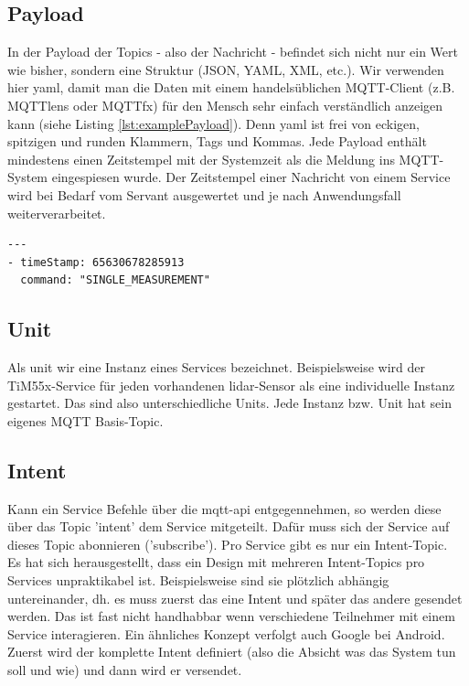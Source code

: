 \subsection{Payload}
In der Payload der Topics - also der Nachricht - befindet sich nicht nur ein Wert wie bisher, sondern eine Struktur (JSON, YAML, XML, etc.). Wir verwenden hier \acrshort{yaml}, damit man die Daten mit einem handelsüblichen MQTT-Client (z.B. MQTTlens\cite{mqtt-lens} oder MQTTfx\cite{mqttfx}) für den Mensch sehr einfach verständlich anzeigen kann (siehe Listing \ref{lst:examplePayload}). Denn \acrshort{yaml} ist frei von eckigen, spitzigen und runden Klammern, Tags und Kommas. Jede Payload enthält mindestens einen Zeitstempel mit der Systemzeit als die Meldung ins MQTT-System eingespiesen wurde. Der Zeitstempel einer Nachricht von einem Service wird bei Bedarf vom Servant ausgewertet und je nach Anwendungsfall weiterverarbeitet.

\begin{lstlisting}[caption={Beispiel einer MQTT-Payload}, label={lst:examplePayload}]
---
- timeStamp: 65630678285913
  command: "SINGLE_MEASUREMENT"
\end{lstlisting}

\subsection{Unit}
Als \gls{unit} wir eine Instanz eines Services bezeichnet. Beispielsweise wird der TiM55x-Service für jeden vorhandenen \acrshort{lidar}-Sensor als eine individuelle Instanz gestartet. Das sind also unterschiedliche Units. Jede Instanz bzw. Unit hat sein eigenes MQTT Basis-Topic.

\subsection{Intent}
Kann ein Service Befehle über die \acrshort{mqtt}-\acrshort{api} entgegennehmen, so werden diese über das Topic '\gls{intent}' dem Service mitgeteilt. Dafür muss sich der Service auf dieses Topic abonnieren ('subscribe'). Pro Service gibt es nur ein Intent-Topic. \\ Es hat sich herausgestellt, dass ein Design mit mehreren Intent-Topics pro Services unpraktikabel ist. Beispielsweise sind sie plötzlich abhängig untereinander, dh. es muss zuerst das eine Intent und später das andere gesendet werden. Das ist fast nicht handhabbar wenn verschiedene Teilnehmer mit einem Service interagieren. Ein ähnliches Konzept verfolgt auch Google bei Android. Zuerst wird der komplette Intent definiert (also die Absicht was das System tun soll und wie) und dann wird er versendet.

